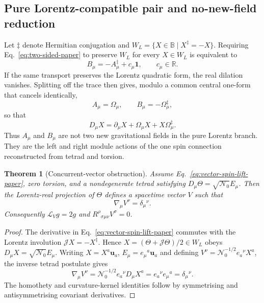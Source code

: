\documentclass[12pt,a4paper]{article}
\newtheorem{theorem}[definition]{Theorem}
\theoremstyle{remark}\newtheorem{remark}[definition]{Remark}
\newcommand{\B}{\mathbb B}
\newcommand{\R}{\mathbb R}
\begin{document}
\subsection{Pure Lorentz-compatible pair and no-new-field reduction}
Let $\ddagger$ denote Hermitian conjugation and
$W_L=\{X\in\B\mid X^\ddagger=-X\}$.  Requiring Eq.~\eqref{eq:two-sided-paper}
to preserve $W_L$ for every $X\in W_L$ is equivalent to
\begin{equation}
 B_\mu=-A_\mu^\ddagger+c_\mu\mathbf1,
 \qquad c_\mu\in\R.
 \label{eq:slice-preserving-pair-paper}
\end{equation}
If the same transport preserves the Lorentz quadratic form, the real dilation
vanishes.  Splitting off the trace then gives, modulo a common central
one-form that cancels identically,
\begin{equation}
 \boxed{A_\mu=\Omega_\mu,\qquad B_\mu=-\Omega_\mu^\ddagger,}
 \label{eq:pure-pair-paper}
\end{equation}
so that
\begin{equation}
 D_\mu X=\partial_\mu X+\Omega_\mu X+X\Omega_\mu^\ddagger.
 \label{eq:vector-spin-lift-paper}
\end{equation}
Thus $A_\mu$ and $B_\mu$ are not two new gravitational fields in the pure
Lorentz branch.  They are the left and right module actions of the one spin
connection reconstructed from tetrad and torsion.

\begin{theorem}[Concurrent-vector obstruction]
Assume Eq.~\eqref{eq:vector-spin-lift-paper}, zero torsion, and a nondegenerate
tetrad satisfying
$D_\mu\Theta=\sqrt{\mathcal N_0}E_\mu$.  Then the Lorentz-real projection of
$\Theta$ defines a spacetime vector $V$ such that
\begin{equation}
 \boxed{\nabla_\mu V^\nu=\delta_\mu{}^\nu.}
 \label{eq:concurrent-paper}
\end{equation}
Consequently $\mathcal L_Vg=2g$ and
$R^\rho{}_{\sigma\mu\nu}V^\sigma=0$.
\end{theorem}

\begin{proof}
The derivative in Eq.~\eqref{eq:vector-spin-lift-paper} commutes with the
Lorentz involution $\mathcal JX=-X^\ddagger$.  Hence
$X=(\Theta+\mathcal J\Theta)/2\in W_L$ obeys
$D_\mu X=\sqrt{\mathcal N_0}E_\mu$.  Writing
$X=X^a\mathbf u_a$, $E_\mu=e_\mu{}^a\mathbf u_a$ and defining
$V^\nu=\mathcal N_0^{-1/2}e_a{}^\nu X^a$, the inverse tetrad postulate gives
\[
 \nabla_\mu V^\nu
 =\mathcal N_0^{-1/2}e_a{}^\nu D_\mu X^a
 =e_a{}^\nu e_\mu{}^a
 =\delta_\mu{}^\nu.
\]
The homothety and curvature-kernel identities follow by symmetrising and
antisymmetrising covariant derivatives.
\end{proof}
\end{document}
